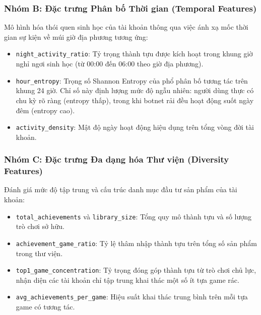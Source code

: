 \subsubsection{Nhóm B: Đặc trưng Phân bố Thời gian (Temporal Features)}
Mô hình hóa thói quen sinh học của tài khoản thông qua việc ánh xạ mốc thời gian sự kiện về múi giờ địa phương tương ứng:
\begin{itemize}
    \item \texttt{night\_activity\_ratio}: Tỷ trọng thành tựu được kích hoạt trong khung giờ nghỉ ngơi sinh học (từ 00:00 đến 06:00 theo giờ địa phương).
    \item \texttt{hour\_entropy}: Trọng số Shannon Entropy của phổ phân bố tương tác trên khung 24 giờ. Chỉ số này định lượng mức độ ngẫu nhiên: người dùng thực có chu kỳ rõ ràng (entropy thấp), trong khi botnet rải đều hoạt động suốt ngày đêm (entropy cao).
    \item \texttt{activity\_density}: Mật độ ngày hoạt động hiệu dụng trên tổng vòng đời tài khoản.
\end{itemize}

\subsubsection{Nhóm C: Đặc trưng Đa dạng hóa Thư viện (Diversity Features)}
Đánh giá mức độ tập trung và cấu trúc danh mục đầu tư sản phẩm của tài khoản:
\begin{itemize}
    \item \texttt{total\_achievements} và \texttt{library\_size}: Tổng quy mô thành tựu và số lượng trò chơi sở hữu.
    \item \texttt{achievement\_game\_ratio}: Tỷ lệ thâm nhập thành tựu trên tổng số sản phẩm trong thư viện.
    \item \texttt{top1\_game\_concentration}: Tỷ trọng đóng góp thành tựu từ trò chơi chủ lực, nhận diện các tài khoản chỉ tập trung khai thác một số ít tựa game rác.
    \item \texttt{avg\_achievements\_per\_game}: Hiệu suất khai thác trung bình trên mỗi tựa game có tương tác.
\end{itemize}

